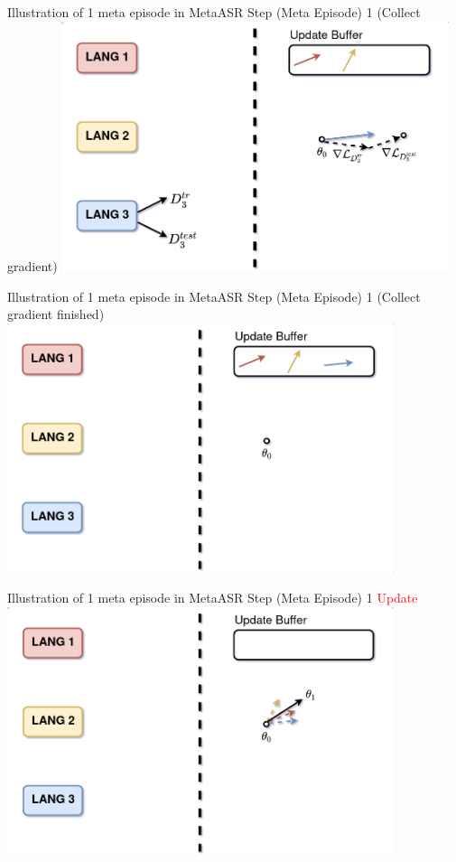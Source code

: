 \documentclass{beamer}
\begin{document}
\begin{frame}[t]{Illustration of 1 meta episode in MetaASR}
  Step (Meta Episode) 1 (Collect gradient)
  \center \includegraphics[width=0.85\textwidth]{fig/meta_step3.png}
\end{frame}

\begin{frame}[t]{Illustration of 1 meta episode in MetaASR}
  Step (Meta Episode) 1 (Collect gradient finished)
  \center \includegraphics[width=0.85\textwidth]{fig/meta_before_update.png}
\end{frame}

\begin{frame}[t]{Illustration of 1 meta episode in MetaASR}
  Step (Meta Episode) 1 \textcolor{red}{Update}
  \center \includegraphics[width=0.85\textwidth]{fig/meta_update.png}
\end{frame}
\end{document}

